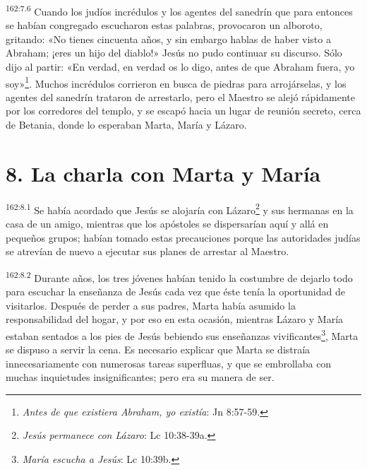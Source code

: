 \par 
\textsuperscript{162:7.6} Cuando los judíos incrédulos y los agentes del sanedrín que para entonces se habían congregado escucharon estas palabras, provocaron un alboroto, gritando: «No tienes cincuenta años, y sin embargo hablas de haber visto a Abraham; ¡eres un hijo del diablo!» Jesús no pudo continuar su discurso. Sólo dijo al partir: «En verdad, en verdad os lo digo, antes de que Abraham fuera, yo soy»\footnote{\textit{Antes de que existiera Abraham, yo existía}: Jn 8:57-59.}. Muchos incrédulos corrieron en busca de piedras para arrojárselas, y los agentes del sanedrín trataron de arrestarlo, pero el Maestro se alejó rápidamente por los corredores del templo, y se escapó hacia un lugar de reunión secreto, cerca de Betania, donde lo esperaban Marta, María y Lázaro.

\section*{8. La charla con Marta y María}
\par 
\textsuperscript{162:8.1} Se había acordado que Jesús se alojaría con Lázaro\footnote{\textit{Jesús permanece con Lázaro}: Lc 10:38-39a.} y sus hermanas en la casa de un amigo, mientras que los apóstoles se dispersarían aquí y allá en pequeños grupos; habían tomado estas precauciones porque las autoridades judías se atrevían de nuevo a ejecutar sus planes de arrestar al Maestro.

\par 
\textsuperscript{162:8.2} Durante años, los tres jóvenes habían tenido la costumbre de dejarlo todo para escuchar la enseñanza de Jesús cada vez que éste tenía la oportunidad de visitarlos. Después de perder a sus padres, Marta había asumido la responsabilidad del hogar, y por eso en esta ocasión, mientras Lázaro y María estaban sentados a los pies de Jesús bebiendo sus enseñanzas vivificantes\footnote{\textit{María escucha a Jesús}: Lc 10:39b.}, Marta se dispuso a servir la cena. Es necesario explicar que Marta se distraía innecesariamente con numerosas tareas superfluas, y que se embrollaba con muchas inquietudes insignificantes; pero era su manera de ser.

